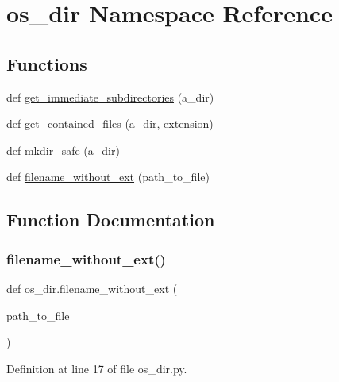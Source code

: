 \hypertarget{namespaceos__dir}{}\section{os\+\_\+dir Namespace Reference}
\label{namespaceos__dir}
\subsection*{Functions}
\begin{DoxyCompactItemize}
\item 
def \mbox{\hyperlink{namespaceos__dir_a7734a1131db0cd10af8ee0a4d9c5241d}{get\+\_\+immediate\+\_\+subdirectories}} (a\+\_\+dir)
\item 
def \mbox{\hyperlink{namespaceos__dir_adfd8c337f0778c2c6fe21892478f5357}{get\+\_\+contained\+\_\+files}} (a\+\_\+dir, extension)
\item 
def \mbox{\hyperlink{namespaceos__dir_ad1414a4868a8da9c6cd962203048d22c}{mkdir\+\_\+safe}} (a\+\_\+dir)
\item 
def \mbox{\hyperlink{namespaceos__dir_a504bf6aacc096b5c5a86495a7485007e}{filename\+\_\+without\+\_\+ext}} (path\+\_\+to\+\_\+file)
\end{DoxyCompactItemize}


\subsection{Function Documentation}
\mbox{\label{namespaceos__dir_a504bf6aacc096b5c5a86495a7485007e}} 
\subsubsection{\texorpdfstring{filename\+\_\+without\+\_\+ext()}{filename\_without\_ext()}}
{\footnotesize\ttfamily def os\+\_\+dir.\+filename\+\_\+without\+\_\+ext (\begin{DoxyParamCaption}\item[{}]{path\+\_\+to\+\_\+file }\end{DoxyParamCaption})}



Definition at line 17 of file os\+\_\+dir.\+py.


